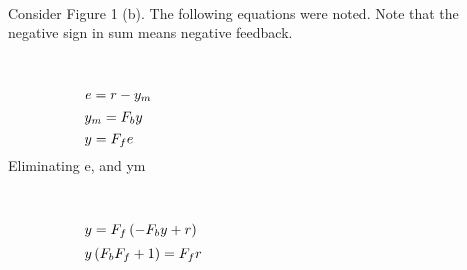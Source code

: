 \documentclass[10pt,a4paper]{article}
\begin{document}
\begin{CJK*}{UTF8}{gbsn}
 \par \ \par\noindent \par \ \par
 \par \ \par\noindent Consider Figure 1 (b). The following equations were noted. Note that the    negative sign in sum means negative feedback. 
 \par \ \par\begin{equation}
 \begin{minipage}{250pt}
                \begin{flushleft} $\displaystyle e = r - y_{m}$  \end{flushleft}
 \end{minipage}
 \end{equation}
\begin{equation}
 \begin{minipage}{250pt}
                \begin{flushleft} $\displaystyle y_{m} = F_{b} y$  \end{flushleft}
 \end{minipage}
 \end{equation}
\begin{equation}
 \begin{minipage}{250pt}
                \begin{flushleft} $\displaystyle y = F_{f} e$  \end{flushleft}
 \end{minipage}
 \end{equation}
\noindent Eliminating e, and ym 
 \par \ \par\begin{equation}
 \begin{minipage}{250pt}
                \begin{flushleft} $\displaystyle y = F_{f} \left(- F_{b} y + r\right)$  \end{flushleft}
 \end{minipage}
 \end{equation}
\begin{equation}
 \begin{minipage}{250pt}
                \begin{flushleft} $\displaystyle y \left(F_{b} F_{f} + 1\right) = F_{f} r$  \end{flushleft}
 \end{minipage}

\end{equation}
\end{CJK*}
\end{document}
